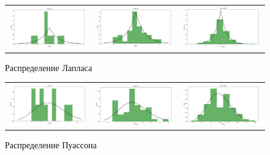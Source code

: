 \begin{figure}[H]
	\centering
	\begin{tabular}{ccc}
		\includegraphics[width=55mm, height =0.25\textheight]{pics/l10.jpg}
		&
		\includegraphics[width=55mm, height =0.25\textheight]{pics/l50.jpg}
		&
		\includegraphics[width=55mm, height =0.25\textheight]{pics/l1000.jpg}
	\end{tabular}
	\caption{Распределение Лапласа}
	\label{fig:laplace}
\end{figure}


\begin{figure}[H]
	\centering
	\begin{tabular}{ccc}
		\includegraphics[width=55mm, height =0.25\textheight]{pics/p10.jpg}
		&
		\includegraphics[width=55mm, height =0.25\textheight]{pics/p50.jpg}
		&
		\includegraphics[width=55mm, height =0.25\textheight]{pics/p1000.jpg}
	\end{tabular}
	\caption{Распределение Пуассона}
	\label{fig:poisson}
\end{figure}


